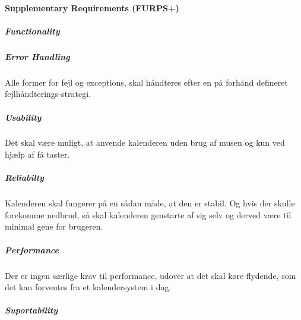 \documentclass{article}
\begin{document}
	
   
   \paragraph{Supplementary Requirements (FURPS+)} \mbox{}
   \subparagraph{Functionality} \mbox{}
   
   \subparagraph{Error Handling} \mbox{}
   
   Alle former for fejl og exceptions, skal håndteres efter en på forhånd defineret fejlhåndterings-strategi.
   \subparagraph{Usability} \mbox{}
   
   Det skal være muligt, at anvende kalenderen uden brug af musen og kun ved hjælp af få taster.
   \subparagraph{Reliabilty} \mbox{}
   
   Kalenderen skal fungerer på en sådan måde, at den er stabil. Og hvis der skulle forekomme nedbrud, så skal kalenderen genstarte af sig selv og derved være til minimal gene for brugeren.
   \subparagraph{Performance} \mbox{}
   
   Der er ingen særlige krav til performance, udover at det skal køre flydende, som det kan forventes fra et kalendersystem i dag.
   \subparagraph{Suportability} \mbox{}
   
   
   
   
  
\end{document}
